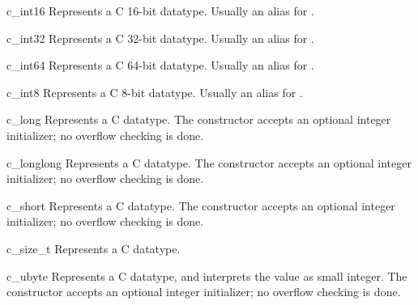 \begin{classdesc}{c_int16}{}
Represents a C 16-bit  datatype.  Usually an alias
for .
\end{classdesc}

\begin{classdesc}{c_int32}{}
Represents a C 32-bit  datatype.  Usually an alias
for .
\end{classdesc}

\begin{classdesc}{c_int64}{}
Represents a C 64-bit  datatype.  Usually an alias
for .
\end{classdesc}

\begin{classdesc}{c_int8}{}
Represents a C 8-bit  datatype.  Usually an alias for .
\end{classdesc}

\begin{classdesc}{c_long}{}
Represents a C  datatype.  The constructor accepts
an optional integer initializer; no overflow checking is done.
\end{classdesc}

\begin{classdesc}{c_longlong}{}
Represents a C  datatype.  The constructor
accepts an optional integer initializer; no overflow checking is done.
\end{classdesc}

\begin{classdesc}{c_short}{}
Represents a C  datatype.  The constructor accepts
an optional integer initializer; no overflow checking is done.
\end{classdesc}

\begin{classdesc}{c_size_t}{}
Represents a C  datatype.
\end{classdesc}

\begin{classdesc}{c_ubyte}{}
Represents a C  datatype, and interprets the value
as small integer.  The constructor accepts an optional integer
initializer; no overflow checking is done.
\end{classdesc}


